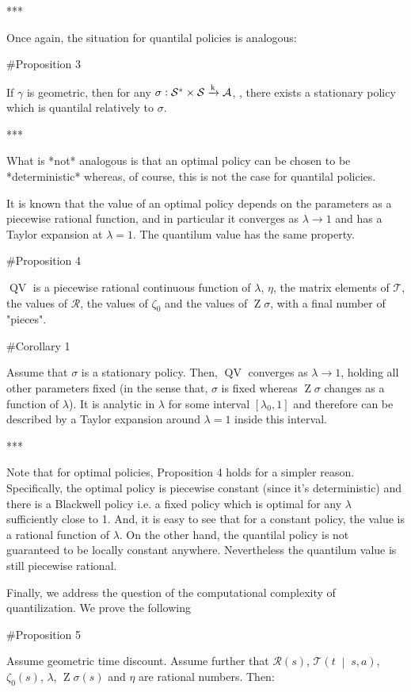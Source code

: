 \documentclass[a4paper]{article}
\newcommand{\AB}[1]{\left[#1\right]}
\newcommand{\APM}[2]{\left(#1\;\middle\vert\;#2\right)}
\newcommand{\K}{\xrightarrow{\textnormal{k}}}
\newcommand{\A}{\mathcal{A}}
\newcommand{\St}{\mathcal{S}}
\newcommand{\T}{\mathcal{T}}
\newcommand{\R}{\mathcal{R}}
\newcommand{\QV}{\operatorname{QV}}
\DeclareMathOperator{\Z}{Z}
\begin{document}
***

Once again, the situation for quantilal policies is analogous:

\#Proposition 3

If $\gamma$ is geometric, then for any $\sigma: \St^* \times \St \K \A$, , there exists a stationary policy which is quantilal relatively to $\sigma$.

***

What is *not* analogous is that an optimal policy can be chosen to be *deterministic* whereas, of course, this is not the case for quantilal policies.

It is known that the value of an optimal policy depends on the parameters as a piecewise rational function, and in particular it converges as $\lambda \rightarrow 1$ and has a Taylor expansion at $\lambda=1$. The quantilum value has the same property.

\#Proposition 4

$\QV$ is a piecewise rational continuous function of $\lambda$, $\eta$, the matrix elements of $\T$, the values of $\R$, the values of $\zeta_0$ and the values of $\Z\sigma$, with a final number of "pieces".

\#Corollary 1

Assume that $\sigma$ is a stationary policy. Then, $\QV$ converges as $\lambda \rightarrow 1$, holding all other parameters fixed (in the sense that, $\sigma$ is fixed whereas $\Z\sigma$ changes as a function of $\lambda$). It is analytic in $\lambda$ for some interval $\AB{\lambda_0,1}$ and therefore can be described by a Taylor expansion around $\lambda=1$ inside this interval.

***

Note that for optimal policies, Proposition 4 holds for a simpler reason. Specifically, the optimal policy is piecewise constant (since it's deterministic) and there is a Blackwell policy i.e. a fixed policy which is optimal for any $\lambda$ sufficiently close to 1. And, it is easy to see that for a constant policy, the value is a rational function of $\lambda$. On the other hand, the quantilal policy is not guaranteed to be locally constant anywhere. Nevertheless the quantilum value is still piecewise rational.

Finally, we address the question of the computational complexity of quantilization. We prove the following

\#Proposition 5

Assume geometric time discount. Assume further that $\R(s)$, $\T\APM{t}{s,a}$, $\zeta_0(s)$, $\lambda$, $\Z{\sigma}(s)$ and $\eta$ are rational numbers. Then:
\end{document}

